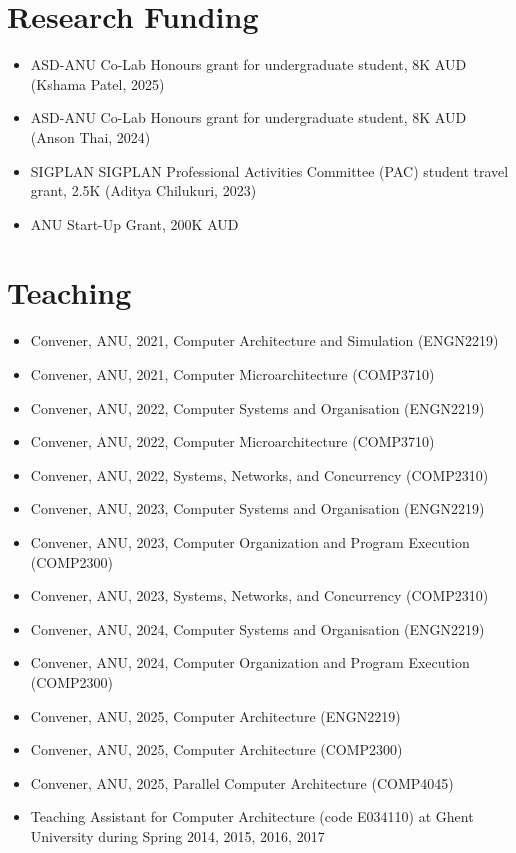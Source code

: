 \documentclass[singlecolumn,singlespace,11pt]{article}
\begin{document}
\section*{Research Funding}
\begin{itemize}
\item ASD-ANU Co-Lab Honours grant for undergraduate student, 8K AUD (Kshama Patel, 2025) 
\item ASD-ANU Co-Lab Honours grant for undergraduate student, 8K AUD (Anson Thai, 2024)
\item SIGPLAN SIGPLAN Professional Activities Committee (PAC) student travel grant, 2.5K (Aditya Chilukuri, 2023)
\item ANU Start-Up Grant, 200K AUD
\end{itemize}

\section*{Teaching}
\begin{itemize}
\item Convener, ANU, 2021, Computer Architecture and Simulation (ENGN2219)
\item Convener, ANU, 2021, Computer Microarchitecture (COMP3710) 
\item Convener, ANU, 2022, Computer Systems and Organisation (ENGN2219)
\item Convener, ANU, 2022, Computer Microarchitecture (COMP3710) 
\item Convener, ANU, 2022, Systems, Networks, and Concurrency (COMP2310) 
\item Convener, ANU, 2023, Computer Systems and Organisation (ENGN2219) 
\item Convener, ANU, 2023, Computer Organization and Program Execution (COMP2300) 
\item Convener, ANU, 2023, Systems, Networks, and Concurrency (COMP2310) 
\item Convener, ANU, 2024, Computer Systems and Organisation (ENGN2219) 
\item Convener, ANU, 2024, Computer Organization and Program Execution (COMP2300)
\item Convener, ANU, 2025, Computer Architecture (ENGN2219) 
\item Convener, ANU, 2025, Computer Architecture (COMP2300)
\item Convener, ANU, 2025, Parallel Computer Architecture (COMP4045) 
\item Teaching Assistant for Computer Architecture (code E034110) at Ghent University during Spring 2014, 2015, 2016, 2017
\end{itemize}
\end{document}
